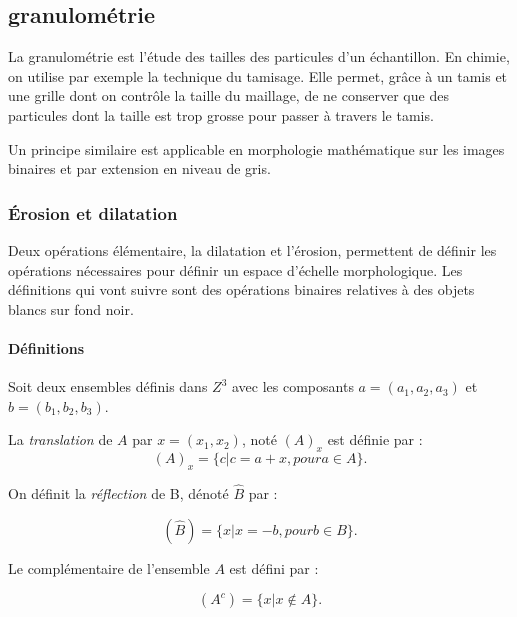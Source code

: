 \subsection{granulométrie}
\label{sec:EA:rehaussement:echelle:granulometrie}

La granulométrie est l'étude des tailles des particules d'un échantillon. En chimie, on utilise par exemple la technique du tamisage. Elle permet, grâce à un tamis et une grille dont on contrôle la taille du maillage, de ne conserver que des particules dont la taille est trop grosse pour passer à travers le tamis.

Un principe similaire est applicable en morphologie mathématique sur les images binaires et par extension en niveau de gris.

\subsubsection{Érosion et dilatation }

Deux opérations élémentaire, la dilatation et l'érosion, permettent de définir les opérations nécessaires pour définir un espace d'échelle morphologique. Les définitions qui vont suivre sont des opérations binaires relatives à des objets blancs sur fond noir.

\paragraph{Définitions}
Soit deux ensembles définis dans $Z^3$ avec les composants $a=(a_1,a_2,a_3)$ et $b=(b_1,b_2,b_3)$.

La \emph{translation} de $A$ par $x = (x_1,x_2)$, noté $(A)_x$ est définie par :
\begin{equation}
  (A)_x = \{c|c = a+x, pour a \in A\}. 
\end{equation}

On définit la \emph{réflection} de B, dénoté $\widehat{B}$ par :

\begin{equation}
  (\widehat{B}) = \{x|x = -b, pour b \in B\}. 
\end{equation}

Le complémentaire de l'ensemble $A$ est défini par :

\begin{equation}
  (A^c) = \{x|x \not\in A\}. 
\end{equation}

